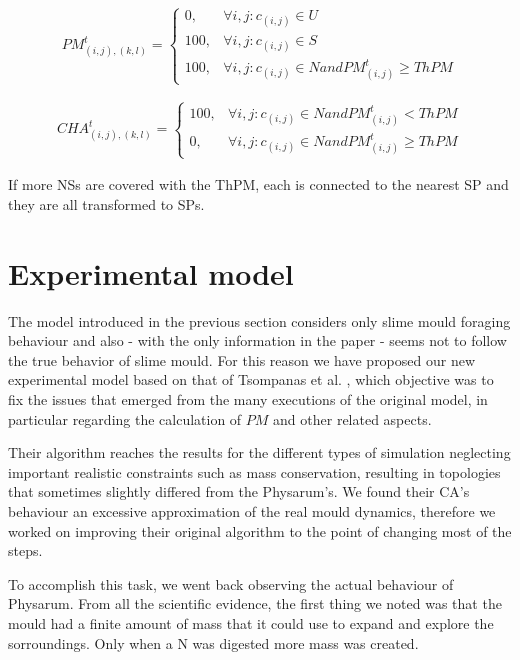 \begin{equation}
PM^t_{(i, j),(k,l)}=
\begin{cases} 
0, & \forall i, j: c_{(i,j)} \in U \\ 
100, & \forall i, j: c_{(i,j)} \in S \\ 
100, & \forall i, j: c_{(i,j)} \in N and  PM^t_{(i, j)} \geq ThPM 
\end{cases}
\end{equation}

\begin{align}
CHA^t_{(i, j),(k,l)}=
\begin{cases} 
100, & \forall i, j: c_{(i,j)} \in N and PM^t_{(i, j)} < ThPM\\ 
0, & \forall i, j: c_{(i,j)} \in N and  PM^t_{(i, j)} \geq ThPM 
\end{cases}
\end{align}

If more NSs are covered with the ThPM, each is connected to the nearest SP and they are all transformed to SPs. 

\section{Experimental model}

The model introduced in the previous section considers only slime mould foraging behaviour and also - with the only information in the paper - seems not to follow the true behavior of slime mould. For this reason we have proposed our new experimental model based on that of Tsompanas et al. \cite{Tsompanas2016}, which objective was to fix the issues that emerged from the many executions of the original model, in particular regarding the calculation of $PM$ and other related aspects.

\par
Their algorithm reaches the results for the different types of simulation neglecting important realistic constraints such as mass conservation, resulting in topologies that sometimes slightly differed from the Physarum's. We found their CA's behaviour an excessive approximation of the real mould dynamics, therefore we worked on improving their original algorithm to the point of changing most of the steps.

\par
To accomplish this task, we went back observing the actual behaviour of Physarum. From all the scientific evidence, the first thing we noted was that the mould had a finite amount of mass that it could use to expand and explore the sorroundings. Only when a N was digested more mass was created. 

